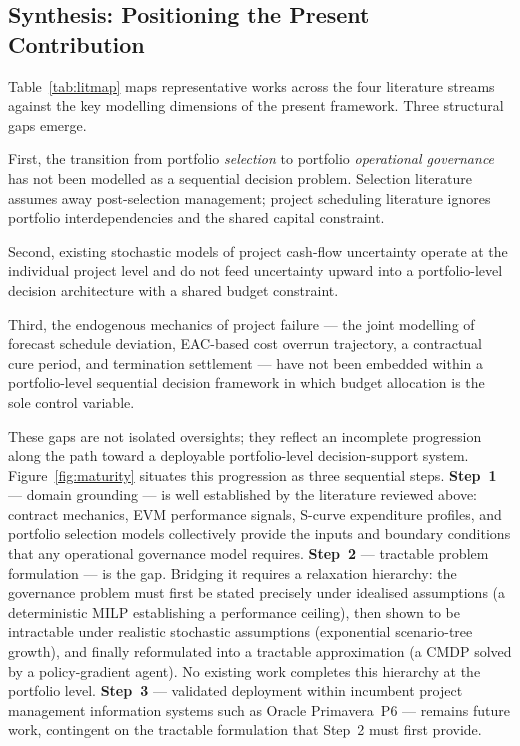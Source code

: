 
\subsection{Synthesis: Positioning the Present Contribution}
\label{subsec:lr_synthesis}

Table~\ref{tab:litmap} maps representative works across the four literature
streams against the key modelling dimensions of the present framework. Three
structural gaps emerge.

First, the transition from portfolio \emph{selection} to portfolio
\emph{operational governance} has not been modelled as a sequential decision
problem. Selection literature assumes away post-selection management; project
scheduling literature ignores portfolio interdependencies and the shared
capital constraint.

Second, existing stochastic models of project cash-flow uncertainty operate at
the individual project level and do not feed uncertainty upward into a
portfolio-level decision architecture with a shared budget constraint.

Third, the endogenous mechanics of project failure --- the joint modelling of
forecast schedule deviation, EAC-based cost overrun trajectory, a contractual
cure period, and termination settlement --- have not been embedded within a
portfolio-level sequential decision framework in which budget allocation is
the sole control variable.

These gaps are not isolated oversights; they reflect an incomplete progression
along the path toward a deployable portfolio-level decision-support system.
Figure~\ref{fig:maturity} situates this progression as three sequential steps.
\textbf{Step~1} --- domain grounding --- is well established by the literature
reviewed above: contract mechanics, EVM performance signals, S-curve
expenditure profiles, and portfolio selection models collectively provide the
inputs and boundary conditions that any operational governance model requires.
\textbf{Step~2} --- tractable problem formulation --- is the gap. Bridging it
requires a relaxation hierarchy: the governance problem must first be stated
precisely under idealised assumptions (a deterministic MILP establishing a
performance ceiling), then shown to be intractable under realistic stochastic
assumptions (exponential scenario-tree growth), and finally reformulated into a
tractable approximation (a CMDP solved by a policy-gradient agent). No existing
work completes this hierarchy at the portfolio level.
\textbf{Step~3} --- validated deployment within incumbent project management
information systems such as Oracle Primavera~P6 --- remains future work,
contingent on the tractable formulation that Step~2 must first provide.

